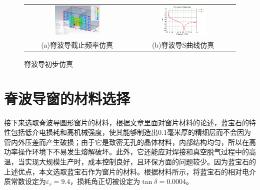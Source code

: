 \documentclass[master]{thesis-uestc}
\begin{document}
\begin{figure}[!htb]
    \small
    \centering
    \begin{tabular}{@{\ }c@{\ }c}
        \includegraphics[width=0.45\textwidth]{pic/chapter3/脊波导初步仿真.png} & 
        \hspace{5pt}
        \includegraphics[width=0.45\textwidth]{pic/chapter3/输入窗脊波导S曲线.png}     \\
        \mbox{\small (a)脊波导截止频率仿真}                                                                               & 
        \mbox{\small (b)脊波导S曲线仿真}                                                                                  \\
    \end{tabular}
    \caption{脊波导初步仿真}
    \label{fig:脊波导初步仿真}
\end{figure}

\section{脊波导窗的材料选择}
接下来选取脊波导圆形窗片的材料，根据文章\cite{han_sapphire_2011}里面对窗片材料的论述，蓝宝石的特性包括低介电损耗和高机械强度，使其能够制造出0.1毫米厚的精细层而不会因为管内外压差而产生破损；由于它是致密无孔的晶体材料，内部结构均匀，所以在高功率操作环境下不易发生熔解破坏。此外，它还能应对焊接和真空脱气过程中的高温，当实现大规模生产时，成本控制良好，且环保方面的问题较少。因为蓝宝石的上述优点，本文选取蓝宝石作为窗片的材料。根据材料\cite{thumm_2020_State}所示，将蓝宝石的相对电介质常数设定为$\varepsilon_r=9.4$，损耗角正切被设定为$\tan \delta = 0.0004$。
\end{document}
